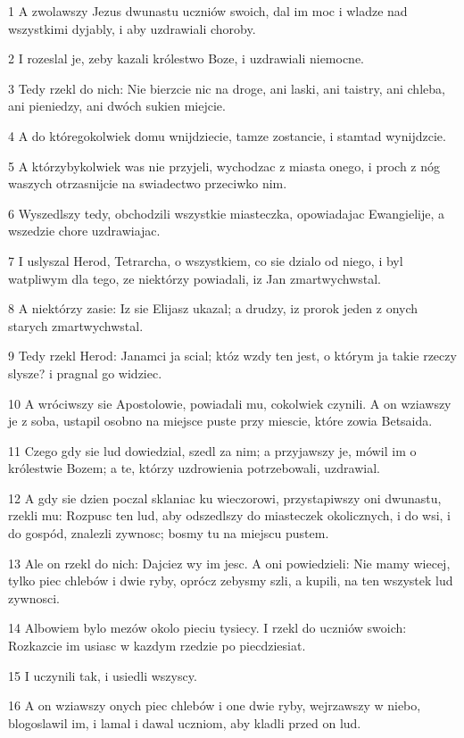 \par 1 A zwolawszy Jezus dwunastu uczniów swoich, dal im moc i wladze nad wszystkimi dyjably, i aby uzdrawiali choroby.
\par 2 I rozeslal je, zeby kazali królestwo Boze, i uzdrawiali niemocne.
\par 3 Tedy rzekl do nich: Nie bierzcie nic na droge, ani laski, ani taistry, ani chleba, ani pieniedzy, ani dwóch sukien miejcie.
\par 4 A do któregokolwiek domu wnijdziecie, tamze zostancie, i stamtad wynijdzcie.
\par 5 A którzybykolwiek was nie przyjeli, wychodzac z miasta onego, i proch z nóg waszych otrzasnijcie na swiadectwo przeciwko nim.
\par 6 Wyszedlszy tedy, obchodzili wszystkie miasteczka, opowiadajac Ewangielije, a wszedzie chore uzdrawiajac.
\par 7 I uslyszal Herod, Tetrarcha, o wszystkiem, co sie dzialo od niego, i byl watpliwym dla tego, ze niektórzy powiadali, iz Jan zmartwychwstal.
\par 8 A niektórzy zasie: Iz sie Elijasz ukazal; a drudzy, iz prorok jeden z onych starych zmartwychwstal.
\par 9 Tedy rzekl Herod: Janamci ja scial; któz wzdy ten jest, o którym ja takie rzeczy slysze? i pragnal go widziec.
\par 10 A wróciwszy sie Apostolowie, powiadali mu, cokolwiek czynili. A on wziawszy je z soba, ustapil osobno na miejsce puste przy miescie, które zowia Betsaida.
\par 11 Czego gdy sie lud dowiedzial, szedl za nim; a przyjawszy je, mówil im o królestwie Bozem; a te, którzy uzdrowienia potrzebowali, uzdrawial.
\par 12 A gdy sie dzien poczal sklaniac ku wieczorowi, przystapiwszy oni dwunastu, rzekli mu: Rozpusc ten lud, aby odszedlszy do miasteczek okolicznych, i do wsi, i do gospód, znalezli zywnosc; bosmy tu na miejscu pustem.
\par 13 Ale on rzekl do nich: Dajciez wy im jesc. A oni powiedzieli: Nie mamy wiecej, tylko piec chlebów i dwie ryby, oprócz zebysmy szli, a kupili, na ten wszystek lud zywnosci.
\par 14 Albowiem bylo mezów okolo pieciu tysiecy. I rzekl do uczniów swoich: Rozkazcie im usiasc w kazdym rzedzie po piecdziesiat.
\par 15 I uczynili tak, i usiedli wszyscy.
\par 16 A on wziawszy onych piec chlebów i one dwie ryby, wejrzawszy w niebo, blogoslawil im, i lamal i dawal uczniom, aby kladli przed on lud.
